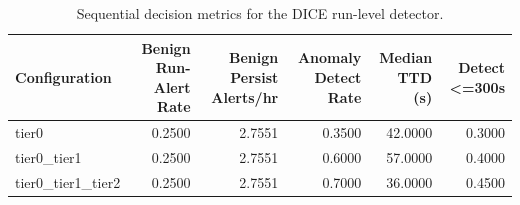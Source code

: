 \begin{table}[t]
\centering
\caption{Sequential decision metrics for the DICE run-level detector.}
\label{tab:dice_sequential_metrics}
\footnotesize
\begin{tabular}{lrrrrr}
\toprule
Configuration & Benign Run-Alert Rate & Benign Persist Alerts/hr & Anomaly Detect Rate & Median TTD (s) & Detect <=300s \\
\midrule
tier0 & 0.2500 & 2.7551 & 0.3500 & 42.0000 & 0.3000 \\
tier0_tier1 & 0.2500 & 2.7551 & 0.6000 & 57.0000 & 0.4000 \\
tier0_tier1_tier2 & 0.2500 & 2.7551 & 0.7000 & 36.0000 & 0.4500 \\
\bottomrule
\end{tabular}

\end{table}

